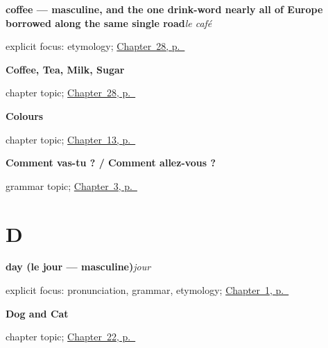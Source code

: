\noindent\begin{minipage}[t]{\linewidth}
\raggedright
\textbf{coffee — masculine, and the one drink-word nearly all of Europe borrowed along the same single road}\enspace\emph{le café}\par
\footnotesize explicit focus: etymology; \hyperref[ch:fr-coffee-tea-milk-sugar]{Chapter~28, p.~\pageref*{ch:fr-coffee-tea-milk-sugar}}
\end{minipage}\par\smallskip

\noindent\begin{minipage}[t]{\linewidth}
\raggedright
\textbf{Coffee, Tea, Milk, Sugar}\par
\footnotesize chapter topic; \hyperref[ch:fr-coffee-tea-milk-sugar]{Chapter~28, p.~\pageref*{ch:fr-coffee-tea-milk-sugar}}
\end{minipage}\par\smallskip

\noindent\begin{minipage}[t]{\linewidth}
\raggedright
\textbf{Colours}\par
\footnotesize chapter topic; \hyperref[ch:colours]{Chapter~13, p.~\pageref*{ch:colours}}
\end{minipage}\par\smallskip

\noindent\begin{minipage}[t]{\linewidth}
\raggedright
\textbf{Comment vas-tu ? / Comment allez-vous ?}\par
\footnotesize grammar topic; \hyperref[ch:how-are-you]{Chapter~3, p.~\pageref*{ch:how-are-you}}
\end{minipage}\par\smallskip

\section*{D}

\noindent\begin{minipage}[t]{\linewidth}
\raggedright
\textbf{day (le jour — masculine)}\enspace\emph{jour}\par
\footnotesize explicit focus: pronunciation, grammar, etymology; \hyperref[ch:greetings]{Chapter~1, p.~\pageref*{ch:greetings}}
\end{minipage}\par\smallskip

\noindent\begin{minipage}[t]{\linewidth}
\raggedright
\textbf{Dog and Cat}\par
\footnotesize chapter topic; \hyperref[ch:fr-dog-and-cat]{Chapter~22, p.~\pageref*{ch:fr-dog-and-cat}}
\end{minipage}\par\smallskip

